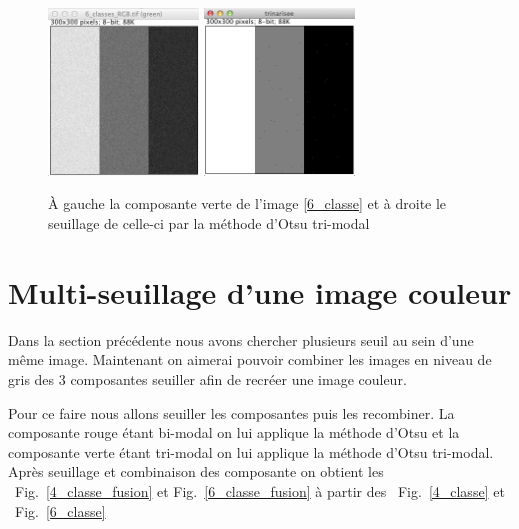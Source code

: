 \documentclass[a4paper,10pt]{article}
\begin{document}
\begin{figure}
\begin{center}
	\includegraphics[width=4cm]{images/6_classe_vert}
	\includegraphics[width=4cm]{images/6_classe_trinaire}
\end{center}
	\caption{\`A gauche la composante verte de l'image \ref{6_classe} et \`a droite le seuillage de celle-ci par la m\'ethode d'Otsu tri-modal}
	\label{6_classe_gris_vert}
\end{figure}

\newpage

\section{Multi-seuillage d'une image couleur}

Dans la section pr\'ec\'edente nous avons chercher plusieurs seuil au sein d'une m\^eme image. Maintenant on aimerai pouvoir combiner les images en niveau de gris des 3 composantes seuiller afin de recr\'eer une image couleur.

Pour ce faire nous allons seuiller les composantes puis les recombiner. La composante rouge \'etant bi-modal on lui applique la m\'ethode d'Otsu et la composante verte \'etant tri-modal on lui applique la m\'ethode d'Otsu tri-modal. \\

Apr\`es seuillage et combinaison des composante on obtient les ~Fig.~\ref{4_classe_fusion} et Fig.~\ref{6_classe_fusion} \`a partir des ~Fig.~\ref{4_classe} et ~Fig.~\ref{6_classe}
\end{document}

